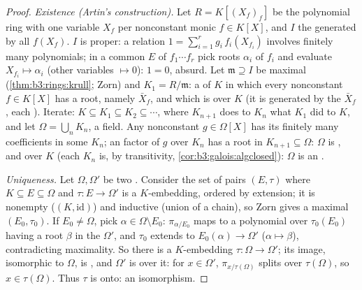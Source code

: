 \begin{proof}
\emph{Existence (Artin's construction).} Let $R = K[(X_f)_f]$ be
the polynomial ring with one variable $X_f$ per nonconstant
monic $f \in K[X]$, and $I$ the  generated by all
$f(X_f)$. $I$ is proper: a relation $1 = \sum_{i=1}^r g_i\,
f_i(X_{f_i})$ involves finitely many polynomials; in a common
 $E$ of $f_1\cdots f_r$ pick roots $\alpha_i$ of
$f_i$ and evaluate $X_{f_i} \mapsto \alpha_i$ (other variables
$\mapsto 0$): $1 = 0$, absurd. Let $\mathfrak m \supseteq I$ be
maximal (\cref{thm:b3:rings:krull}; Zorn) and $K_1 = R/\mathfrak
m$: a  of $K$ in which every nonconstant $f \in
K[X]$ has a root, namely $\bar X_f$, and which is  over
$K$ (it is generated by the $\bar X_f$, each ).
Iterate: $K \subseteq K_1 \subseteq K_2 \subseteq \cdots$, where
$K_{n+1}$ does to $K_n$ what $K_1$ did to $K$, and let $\Omega =
\bigcup_n K_n$, a field. Any nonconstant $g \in \Omega[X]$ has
its finitely many coefficients in some $K_n$; an 
factor of $g$ over $K_n$ has a root in $K_{n+1} \subseteq
\Omega$: $\Omega$ is , and  over
$K$ (each $K_n$ is, by transitivity,
\cref{cor:b3:galois:algclosed}): $\Omega$ is an .

\emph{Uniqueness.} Let $\Omega, \Omega'$ be two . Consider the set of pairs $(E, \tau)$ where $K
\subseteq E \subseteq \Omega$ and $\tau\colon E \to \Omega'$ is a
$K$-embedding, ordered by extension; it is nonempty ($(K,
\mathrm{id})$) and inductive (union of a chain), so Zorn gives a
maximal $(E_0, \tau_0)$. If $E_0 \neq \Omega$, pick $\alpha \in
\Omega\setminus E_0$: $\pi_{\alpha/E_0}$ maps to a polynomial
over $\tau_0(E_0)$ having a root $\beta$ in the  $\Omega'$, and $\tau_0$ extends to $E_0(\alpha) \to
\Omega'$ ($\alpha \mapsto \beta$), contradicting maximality. So
there is a $K$-embedding $\tau \colon \Omega \to \Omega'$; its
image, isomorphic to $\Omega$, is , and
$\Omega'$ is  over it: for $x \in \Omega'$,
$\pi_{x/\tau(\Omega)}$ splits over $\tau(\Omega)$, so $x \in
\tau(\Omega)$. Thus $\tau$ is onto: an isomorphism.
\end{proof}

